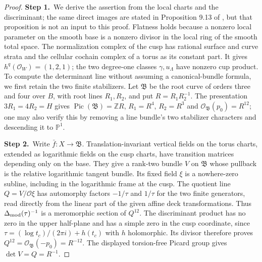 \documentclass[11pt,a4paper]{article}
\theoremstyle{plain}
\theoremstyle{definition}
\begin{document}
\begin{proof}
\par\smallskip\noindent\textbf{Step 1.}\ We derive the assertion from the local charts and the discriminant;
the same direct images are stated in Proposition 9.13 of
\cite{AC26}, but that proposition is not an input to this proof.
Flatness holds
because a nonzero local parameter on the smooth base is a nonzero divisor
in the local ring of the smooth total space.  The normalization complex
of the cusp has rational surface and curve strata and the cellular
cochain complex of a torus as its constant part.  It gives
$h^q(\mathcal O_W)=(1,2,1)$; the two degree-one classes $\gamma,u_{\Lambda}$ have nonzero
cup product.  To compute the determinant line without assuming a
canonical-bundle formula, we first retain the two finite stabilizers.
Let $\mathfrak B$ be the root curve of orders three and four over $B$,
with root lines $R_1,R_2$, and put $R=R_1R_2^{-1}$.  The presentation
$3R_1=4R_2=H$ gives $\operatorname{Pic}(\mathfrak B)=\mathbb Z R$,
$R_1=R^4$, $R_2=R^3$ and $\mathcal O_{\mathfrak B}(p_0)=R^{12}$;
one may also verify this by removing a line bundle's two stabilizer
characters and descending it to $\mathbb P^1$.

\par\smallskip\noindent\textbf{Step 2.}\ Write $\bar f:X\to\mathfrak B$.  Translation-invariant vertical
fields on the torus charts, extended as logarithmic fields on the cusp
charts, have transition matrices depending only on the base.  They
give a rank-two bundle $V$ on $\mathfrak B$ whose pullback is the
relative logarithmic tangent bundle.  Its fixed field $\xi$ is a
nowhere-zero subline, including in the logarithmic frame at the cusp.
The quotient line $Q=V/\mathcal O\xi$ has automorphy factors $-1/\tau$
and $1/\tau$ for the two finite generators, read directly from the
linear part of the given affine deck transformations.  Thus
$\Delta_{\rm mod}(\tau)^{-1}$ is a meromorphic section of $Q^{12}$.
The discriminant product has no zero in the upper half-plane and
has a simple zero in the cusp coordinate, since
$\tau=(\log t_c)/(2\pi i)+h(t_c)$ with $h$ holomorphic.  Its divisor
therefore proves $Q^{12}=\mathcal O_{\mathfrak B}(-p_0)=R^{-12}$.
The displayed torsion-free Picard group gives
$\det V=Q=R^{-1}$.


\end{proof}
\end{document}
